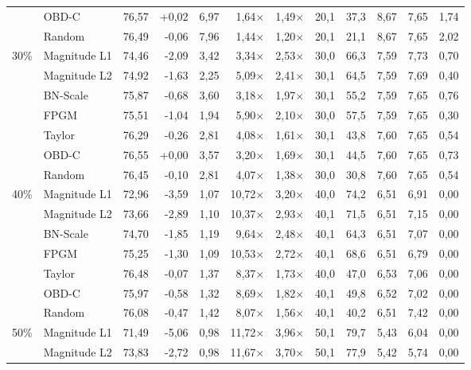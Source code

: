 \begin{table}[H]
{{\begin{tabular}{c l rr rrr rr rrr}
     & OBD-C & 76,57 & +0,02 & 6,97 & 1,64$\times$ & 1,49$\times$ & 20,1 & 37,3 & 8,67 & 7,65 & 1,74 \\
     & Random & 76,49 & -0,06 & 7,96 & 1,44$\times$ & 1,20$\times$ & 20,1 & 21,1 & 8,67 & 7,65 & 2,02 \\
    \midrule
    \multirow{7}{*}{30\%} & Magnitude L1 & 74,46 & -2,09 & 3,42 & 3,34$\times$ & 2,53$\times$ & 30,0 & 66,3 & 7,59 & 7,73 & 0,70 \\
     & Magnitude L2 & 74,92 & -1,63 & 2,25 & 5,09$\times$ & 2,41$\times$ & 30,1 & 64,5 & 7,59 & 7,69 & 0,40 \\
     & BN-Scale & 75,87 & -0,68 & 3,60 & 3,18$\times$ & 1,97$\times$ & 30,1 & 55,2 & 7,59 & 7,65 & 0,76 \\
     & FPGM & 75,51 & -1,04 & 1,94 & 5,90$\times$ & 2,10$\times$ & 30,0 & 57,5 & 7,59 & 7,65 & 0,30 \\
     & Taylor & 76,29 & -0,26 & 2,81 & 4,08$\times$ & 1,61$\times$ & 30,1 & 43,8 & 7,60 & 7,65 & 0,54 \\
     & OBD-C & 76,55 & +0,00 & 3,57 & 3,20$\times$ & 1,69$\times$ & 30,1 & 44,5 & 7,60 & 7,65 & 0,73 \\
     & Random & 76,45 & -0,10 & 2,81 & 4,07$\times$ & 1,38$\times$ & 30,0 & 30,8 & 7,60 & 7,65 & 0,54 \\
    \midrule
    \multirow{7}{*}{40\%} & Magnitude L1 & 72,96 & -3,59 & 1,07 & 10,72$\times$ & 3,20$\times$ & 40,0 & 74,2 & 6,51 & 6,91 & 0,00 \\
     & Magnitude L2 & 73,66 & -2,89 & 1,10 & 10,37$\times$ & 2,93$\times$ & 40,1 & 71,5 & 6,51 & 7,15 & 0,00 \\
     & BN-Scale & 74,70 & -1,85 & 1,19 & 9,64$\times$ & 2,48$\times$ & 40,1 & 64,3 & 6,51 & 7,07 & 0,00 \\
     & FPGM & 75,25 & -1,30 & 1,09 & 10,53$\times$ & 2,72$\times$ & 40,1 & 68,6 & 6,51 & 6,79 & 0,00 \\
     & Taylor & 76,48 & -0,07 & 1,37 & 8,37$\times$ & 1,73$\times$ & 40,0 & 47,0 & 6,53 & 7,06 & 0,00 \\
     & OBD-C & 75,97 & -0,58 & 1,32 & 8,69$\times$ & 1,82$\times$ & 40,1 & 49,8 & 6,52 & 7,02 & 0,00 \\
     & Random & 76,08 & -0,47 & 1,42 & 8,07$\times$ & 1,56$\times$ & 40,1 & 40,2 & 6,51 & 7,42 & 0,00 \\
    \midrule
    \multirow{7}{*}{50\%} & Magnitude L1 & 71,49 & -5,06 & 0,98 & 11,72$\times$ & 3,96$\times$ & 50,1 & 79,7 & 5,43 & 6,04 & 0,00 \\
     & Magnitude L2 & 73,83 & -2,72 & 0,98 & 11,67$\times$ & 3,70$\times$ & 50,1 & 77,9 & 5,42 & 5,74 & 0,00 \\

\end{tabular}}}
\end{table}
